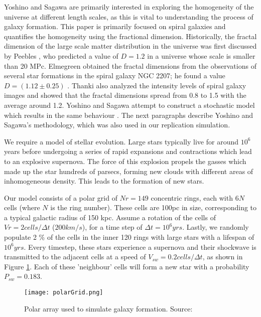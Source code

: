 \documentclass[amsmath,amssymb,reprint,
tightenlines,aps,prl,11pt]{revtex4-1}
\begin{document}
Yoshino and Sagawa are primarily interested in exploring the homogeneity of the universe at different length scales, as this is vital to understanding the process of galaxy formation. This paper is primarily focused on spiral galaxies and quantifies the homogeneity using the fractional dimension. Historically, the fractal dimension of the large scale matter distribution in the universe was first
discussed by Peebles \cite{peeblesBlackBodyRadiationContent1965}, who predicted a value of $D = 1.2$ in a universe whose scale is smaller than 20 MPc. Elmegreen obtained the fractal dimensions from the observations of several star formations in the spiral
galaxy NGC 2207; he found a value $D = (1.12 \pm 0.25)$ \cite{peeblesBlackBodyRadiationContent1965}. Thanki also analyzed the intensity levels of spiral galaxy images and showed that the fractal dimensions spread from 0.8 to 1.5 with the average around 1.2. Yoshino and Sagawa attempt to construct a stochastic model which results in the same behaviour \cite{yoshinoMONTECARLOSIMULATION2008}. The next paragraphs describe Yoshino and Sagawa's methodology, which was also used in our replication simulation.

We require a model of stellar evolution. Large stars typically live for around $10^6$ years before undergoing a series of rapid expansions and contractions which lead to an explosive supernova. The force of this explosion propels the gasses which made up the star hundreds of parsecs, forming new clouds with different areas of inhomogeneous density. This leads to the formation of new stars. 

Our model consists of a polar grid of $Nr = 149$ concentric rings, each with $6N$ cells (where $N$ is the ring number). These cells are 100pc in size, corresponding to a typical galactic radius of 150 kpc. Assume a rotation of the cells of $Vr = 2 cells/\Delta t$ ($200 km/s$), for a time step of $\Delta t = 10^6 yrs$. Lastly, we randomly populate 2 \% of the cells in the inner 120 rings with large stars with a lifespan of $10^6 yrs$. Every timestep, these stars experience a supernova and their shockwave is transmitted to the adjacent cells at a speed of $V_{sw} = 0.2 cells/ \Delta t$, as shown in Figure \ref{fig:setup}. Each of these 'neighbour' cells will form a new star with a probability $P_{sw} = 0.183$.  \\

\begin{figure}
\centering
\begin{adjustbox}{center}
\texttt{[image: polarGrid.png]}
\end{adjustbox}
\caption{Polar array used to simulate galaxy formation. Source: \cite{yoshinoMONTECARLOSIMULATION2008}}
\label{fig:setup}
\end{figure}
\end{document}
